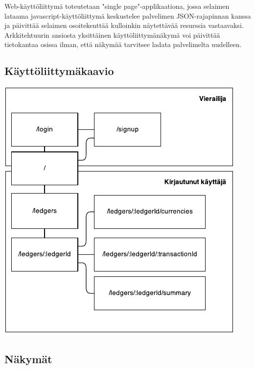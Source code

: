 \documentclass[a4paper,parskip=half]{scrartcl}
\begin{document}
Web-käyttöliittymä toteutetaan "single page"-applikaationa, jossa selaimen
lataama javascript-käyttöliittymä keskustelee palvelimen JSON-rajapinnan
kanssa ja päivittää selaimen osoitekenttää kulloinkin näytettävää resurssia
vastaavaksi. Arkkitehtuurin ansiosta yksittäinen käyttöliittymänäkymä voi
päivittää tietokantaa osissa ilman, että näkymää tarvitsee ladata palvelimelta
uudelleen.

\subsection{Käyttöliittymäkaavio}

\includegraphics[scale=1.5]{ui}

\subsection{Näkymät}
\end{document}

